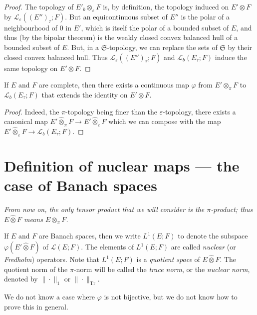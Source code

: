 \documentclass{article}
\theoremstyle{plain}
\newenvironment{corollary}[1]
    {\renewcommand\theinnercustomcorollary{#1}\innercustomcorollary}
    {\endinnercustomcorollary}
\theoremstyle{definition}
\newenvironment{definition}[1]
    {\renewcommand\theinnercustomdefinition{#1}\innercustomdefinition}
    {\endinnercustomdefinition}
\newcommand{\LL}{\mathcal{L}}
\newcommand{\projotimes}{{\otimes}_\pi}
\newcommand{\injotimes}{{\otimes}_\varepsilon}
\newcommand{\cprojotimes}{\widehat{\otimes}_\pi}
\newcommand{\cinjotimes}{\widehat{\otimes}_\varepsilon}
\newcommand{\cotimes}{\widehat{\otimes}}
\newcommand{\tr}{\operatorname{Tr}}
\newcommand{\oldpage}[1]{\marginpar{\footnotesize$\Big\vert$ \textit{p.~#1}}}
\begin{document}
\begin{proof}
  The topology of $E'_b\injotimes F$ is, by definition, the topology induced on $E'\otimes F$ by $\LL_\varepsilon((E'')_\tau;F)$.
  But an equicontinuous subset of $E''$ is the  polar of a neighbourhood of $0$ in $E'$, which is itself the polar of a bounded subset of $E$, and thus (by the bipolar theorem) is the weakly closed convex balanced hull of a bounded subset of $E$.
  But, in a $\mathfrak{S}$-topology, we can replace the sets of $\mathfrak{S}$ by their closed convex balanced hull.
  Thus $\LL_\varepsilon((E'')_\tau;F)$ and $\LL_b(E_\tau;F)$ induce the same topology on $E'\otimes F$.
\end{proof}

\begin{corollary}{1}
\label{corollary-1}
  If $E$ and $F$ are complete, then there exists a continuous map $\varphi$ from $E'\projotimes F$ to $\LL_b(E_\tau;F)$ that extends the identity on $E'\otimes F$.
\end{corollary}

\begin{proof}
  Indeed, the $\pi$-topology being finer than the $\varepsilon$-topology, there exists a canonical map $E'\cprojotimes F\to E'\cinjotimes F$ which we can compose with the map $E'\cinjotimes F\to \LL_b(E_\tau;F)$.
\end{proof}

\section{Definition of nuclear maps --- the case of Banach spaces}
\label{section3}

\oldpage{3}
\emph{From now on, the only tensor product that we will consider is the $\pi$-product; thus $E\cotimes F$ means $E\cprojotimes F$.}

\begin{definition}{1}
\label{definition1}
  If $E$ and $F$ are Banach spaces, then we write $L^1(E;F)$ to denote the subspace $\varphi(E'\cotimes F)$ of $\LL(E;F)$.
  The elements of $L^1(E;F)$ are called \emph{nuclear} (or \emph{Fredholm}) operators.
  Note that $L^1(E;F)$ is a \emph{quotient space} of $E\cotimes F$.
  The quotient norm of the $\pi$-norm will be called the \emph{trace norm}, or the \emph{nuclear norm}, denoted by $\|\cdot\|_1$ or $\|\cdot\|_{\tr}$.
\end{definition}

We do not know a case where $\varphi$ is not bijective, but we do not know how to prove this in general.
\end{document}
